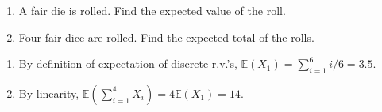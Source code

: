 
\setcounter{theorem}{2}
\begin{exercise} [BH.4.3]
    \begin{enumerate}
		\item A fair die is rolled. Find the expected value of the roll.
		\item Four fair dice are rolled. Find the expected total of the rolls.
	\end{enumerate}
\begin{solution}
    \begin{enumerate}
	    \item By definition of expectation of discrete r.v.'s, $\mathbb{E}(X_1)=\sum_{i=1}^{6} i/6 =3.5$. 
		\item By linearity, $\mathbb{E}(\sum_{i=1}^4 X_i) =4\mathbb{E}(X_1)= 14$.  
	\end{enumerate}
\end{solution}
\end{exercise}

